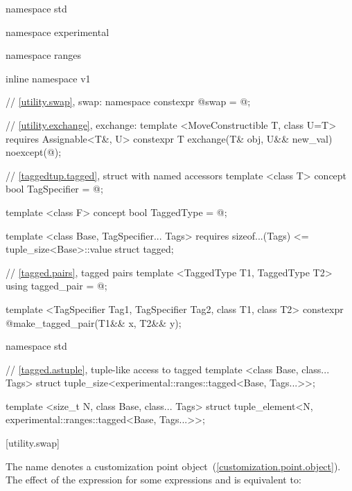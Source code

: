 \begin{codeblock}
namespace std { namespace experimental { namespace ranges { inline namespace v1 {
  // \ref{utility.swap}, swap:
  namespace {
    constexpr @\unspec@ swap = @\unspec@;
  }

  // \ref{utility.exchange}, exchange:
  template <MoveConstructible T, class U=T>
    requires Assignable<T&, U>
  constexpr T exchange(T& obj, U&& new_val) noexcept(@\seebelow@);

  // \ref{taggedtup.tagged}, struct with named accessors
  template <class T>
  concept bool TagSpecifier = @\seebelow@;

  template <class F>
  concept bool TaggedType = @\seebelow@;

  template <class Base, TagSpecifier... Tags>
    requires sizeof...(Tags) <= tuple_size<Base>::value
  struct tagged;

  // \ref{tagged.pairs}, tagged pairs
  template <TaggedType T1, TaggedType T2> using tagged_pair = @\seebelow@;

  template <TagSpecifier Tag1, TagSpecifier Tag2, class T1, class T2>
  constexpr @\seebelow@ make_tagged_pair(T1&& x, T2&& y);
}}}}

namespace std {
  // \ref{tagged.astuple}, tuple-like access to tagged
  template <class Base, class... Tags>
  struct tuple_size<experimental::ranges::tagged<Base, Tags...>>;

  template <size_t N, class Base, class... Tags>
  struct tuple_element<N, experimental::ranges::tagged<Base, Tags...>>;
}
\end{codeblock}

[utility.swap]{}

%
\pnum The name  denotes a customization point
object~(\ref{customization.point.object}). The effect of the expression
 for some expressions 
and  is equivalent to:

